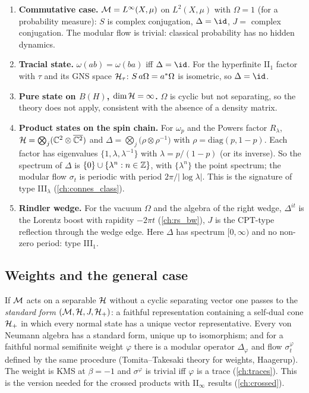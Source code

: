 \begin{enumerate}
\item \textbf{Commutative case.} $\mathcal{M}=L^\infty(X,\mu)$ on $L^2(X,\mu)$ with $\Omega=1$ (for a probability measure): $S$ is complex conjugation, $\Delta=\id$, $J=$ complex conjugation. The modular flow is trivial: classical probability has no hidden dynamics.
\item \textbf{Tracial state.} $\omega(ab)=\omega(ba)$ iff $\Delta=\id$. For the hyperfinite II$_1$ factor with $\tau$ and its GNS space $\mathcal{H}_\tau$: $S\,a\Omega=a^{*}\Omega$ is isometric, so $\Delta=\id$.
\item \textbf{Pure state on $B(H)$, $\dim\mathcal{H}=\infty$.} $\Omega$ is cyclic but not separating, so the theory does not apply, consistent with the absence of a density matrix.
\item \textbf{Product states on the spin chain.} For $\omega_p$ and the Powers factor $R_\lambda$, $\mathcal{H}=\bigotimes_j(\mathbb{C}^2\otimes\overline{\mathbb{C}^2})$ and $\Delta=\bigotimes_j\big(\rho\otimes\rho^{-1}\big)$ with $\rho=\mathrm{diag}(p,1-p)$. Each factor has eigenvalues $\{1,\lambda,\lambda^{-1}\}$ with $\lambda=p/(1-p)$ (or its inverse). So the spectrum of $\Delta$ is $\{0\}\cup\{\lambda^n:n\in\mathbb{Z}\}$, with $\{\lambda^n\}$ the point spectrum; the modular flow $\sigma_t$ is periodic with period $2\pi/|\log\lambda|$. This is the signature of type III$_\lambda$ (\cref{ch:connes_class}).
\item \textbf{Rindler wedge.} For the vacuum $\Omega$ and the algebra of the right wedge, $\Delta^{it}$ is the Lorentz boost with rapidity $-2\pi t$ (\cref{ch:rs_bw}), $J$ is the CPT-type reflection through the wedge edge. Here $\Delta$ has spectrum $[0,\infty)$ and no non-zero period: type III$_1$.
\end{enumerate}

\subsection{Weights and the general case}

If $\mathcal{M}$ acts on a separable $\mathcal{H}$ without a cyclic separating vector one passes to the \emph{standard form} $(\mathcal{M},\mathcal{H},J,\mathcal{H}_+)$: a faithful representation containing a self-dual cone $\mathcal{H}_+$ in which every normal state has a unique vector representative. Every von Neumann algebra has a standard form, unique up to isomorphism; and for a faithful normal semifinite weight $\varphi$ there is a modular operator $\Delta_\varphi$ and flow $\sigma^\varphi_t$ defined by the same procedure (Tomita--Takesaki theory for weights, Haagerup). The weight is KMS at $\beta=-1$ and $\sigma^\varphi$ is trivial iff $\varphi$ is a trace (\cref{ch:traces}). This is the version needed for the crossed products with II$_\infty$ results (\cref{ch:crossed}).

